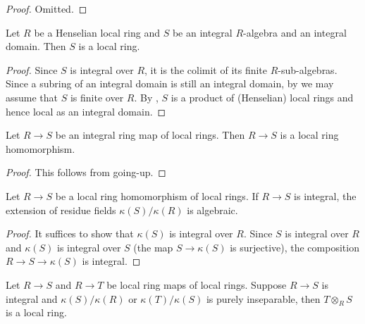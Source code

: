 \begin{proof}
    Omitted.
\end{proof}

\begin{lemma}
    Let $R$ be a Henselian local ring and $S$ be an integral $R$-algebra and an integral domain.
    Then $S$ is a local ring.
    \label{lemma:henselian-local-integral-local}
    \leanok
\end{lemma}

\begin{proof}
    Since $S$ is integral over $R$, it is the colimit of its finite $R$-sub-algebras. Since
    a subring of an integral domain is still an integral domain, by  we
    may assume that $S$ is finite over $R$.
    By , $S$ is a product of (Henselian) local rings and hence
    local as an integral domain.
\end{proof}

\begin{lemma}
    Let $R \to S$ be an integral ring map of local rings. Then $R \to S$ is a local ring homomorphism.
    \label{lemma:integral-local-hom}
    \leanok
\end{lemma}

\begin{proof}
    \leanok
    This follows from going-up.
\end{proof}

\begin{lemma}
    Let $R \to S$ be a local ring homomorphism of local rings. If $R \to S$ is integral,
    the extension of residue fields $\kappa(S) / \kappa(R)$ is algebraic.
    \label{lemma:integral-local-algebraic-residue-field}
    \leanok
\end{lemma}

\begin{proof}
    It suffices to show that $\kappa(S)$ is integral over $R$. Since $S$ is integral over $R$
    and $\kappa(S)$ is integral over $S$ (the map $S \to \kappa(S)$ is surjective),
    the composition $R \to S \to \kappa(S)$ is integral.
\end{proof}

\begin{lemma}
    Let $R \to S$ and $R \to T$ be local ring maps of local rings. Suppose
    $R \to S$ is integral and $\kappa(S) / \kappa(R)$ or $\kappa(T) / \kappa(S)$
    is purely inseparable, then $T \otimes_{R} S$ is a local ring.
    \label{lemma:tensorprod-local-purely-inseparable}
    \leanok
\end{lemma}

